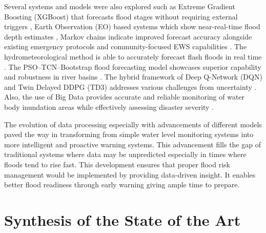 \documentclass{research}
\begin{document}
Several systems and models were also explored such as Extreme Gradient Boosting (XGBoost) 
that forecasts flood stages without requiring external triggers \cite{sanders2022datadriven}, 
Earth Observation (EO) based systems which show near-real-time flood depth estimates \cite{destefanis2025advancing}, 
Markov chains indicate improved forecast accuracy alongside existing emergency protocols \cite{bibbo2025flood} and 
community-focused EWS capabilities \cite{cheong2024development}. The hydrometeorological 
method is able to accurately forecast flash floods in real time \cite{troselj2023realtime}. 
The PSO--TCN--Bootstrap flood forecasting model showcases superior capability and robustness in 
river basins \cite{yu2025research}. The hybrid framework of Deep Q-Network (DQN) and Twin 
Delayed DDPG (TD3) addresses various challenges from uncertainty \cite{rashid2024realtime}. 
Also, the use of Big Data provides accurate and reliable monitoring of water body inundation areas 
while effectively assessing disaster severity \cite{hou2025development}.

The evolution of data processing especially with advancements of different models paved the 
way in transforming from simple water level monitoring systems into more intelligent and 
proactive warning systems. This advancement fills the gap of traditional systems where data 
may be unpredicted especially in times where floods tend to rise fast. This development 
ensures that proper flood risk management would be implemented by providing data-driven 
insight. It enables better flood readiness through early warning giving ample time to 
prepare.

\section{Synthesis of the State of the Art}
\end{document}
